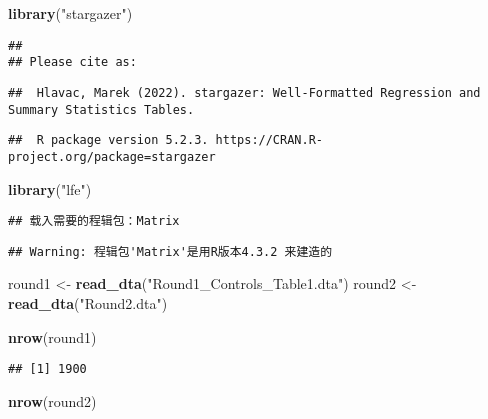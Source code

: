 \documentclass[
]{article}
\newenvironment{Shaded}{\begin{snugshade}}{\end{snugshade}}
\newcommand{\FunctionTok}[1]{\textcolor[rgb]{0.13,0.29,0.53}{\textbf{#1}}}
\newcommand{\NormalTok}[1]{#1}
\newcommand{\OtherTok}[1]{\textcolor[rgb]{0.56,0.35,0.01}{#1}}
\newcommand{\StringTok}[1]{\textcolor[rgb]{0.31,0.60,0.02}{#1}}
\begin{document}
\begin{Shaded}
\begin{Highlighting}[]
\FunctionTok{library}\NormalTok{(}\StringTok{"stargazer"}\NormalTok{)}
\end{Highlighting}
\end{Shaded}

\begin{verbatim}
## 
## Please cite as:
\end{verbatim}

\begin{verbatim}
##  Hlavac, Marek (2022). stargazer: Well-Formatted Regression and Summary Statistics Tables.
\end{verbatim}

\begin{verbatim}
##  R package version 5.2.3. https://CRAN.R-project.org/package=stargazer
\end{verbatim}

\begin{Shaded}
\begin{Highlighting}[]
\FunctionTok{library}\NormalTok{(}\StringTok{"lfe"}\NormalTok{)}
\end{Highlighting}
\end{Shaded}

\begin{verbatim}
## 载入需要的程辑包：Matrix
\end{verbatim}

\begin{verbatim}
## Warning: 程辑包'Matrix'是用R版本4.3.2 来建造的
\end{verbatim}

\begin{Shaded}
\begin{Highlighting}[]
\NormalTok{round1 }\OtherTok{\textless{}{-}} \FunctionTok{read\_dta}\NormalTok{(}\StringTok{"Round1\_Controls\_Table1.dta"}\NormalTok{)}
\NormalTok{round2 }\OtherTok{\textless{}{-}} \FunctionTok{read\_dta}\NormalTok{(}\StringTok{"Round2.dta"}\NormalTok{)}

\FunctionTok{nrow}\NormalTok{(round1)}
\end{Highlighting}
\end{Shaded}

\begin{verbatim}
## [1] 1900
\end{verbatim}

\begin{Shaded}
\begin{Highlighting}[]
\FunctionTok{nrow}\NormalTok{(round2)}
\end{Highlighting}
\end{Shaded}
\end{document}
